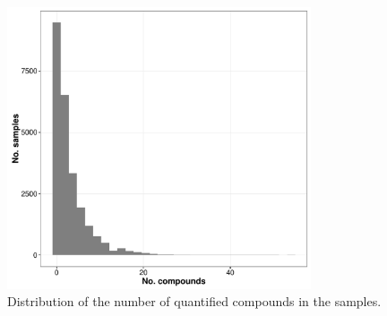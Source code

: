 \documentclass[pdftex,
	a4paper,
	titlepage=false]{scrreprt}
\begin{document}
\begin{figure}[ht]
	\centering
	\includegraphics[width = 0.8\textwidth]{pmix}
	\caption{Distribution of the number of quantified compounds in the samples.}
	\label{fig:pmix}
\end{figure}


% 
\end{document}

